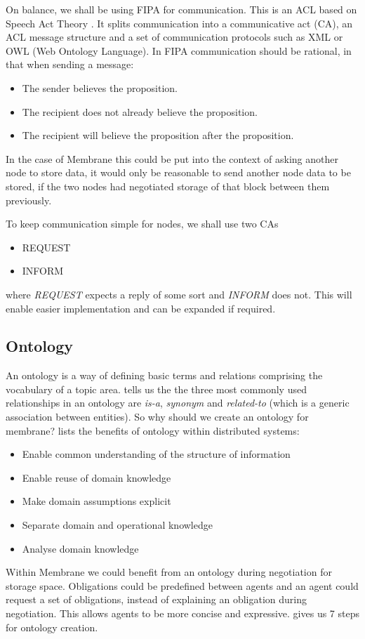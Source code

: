 \documentclass[11pt, a4paper, twocolumn, twoside]{report}
\begin{document}
On balance, we shall be using FIPA for communication. This is an ACL based on Speech Act Theory \citep{labrou1999agent}. It splits communication into a communicative act (CA), an ACL message structure and a set of communication protocols such as XML or OWL (Web Ontology Language). In FIPA communication should be rational, in that when sending a message:
\begin{itemize}
  \item The sender believes the proposition.
  \item The recipient does not already believe the proposition.
  \item The recipient will believe the proposition after the proposition.
\end{itemize}
In the case of Membrane this could be put into the context of asking another node to store data, it would only be reasonable to send another node data to be stored, if the two nodes had negotiated storage of that block between them previously.

To keep communication simple for nodes, we shall use two CAs
\begin{itemize}
  \item REQUEST
  \item INFORM
\end{itemize}
where \emph{REQUEST} expects a reply of some sort and \emph{INFORM} does not. This will enable easier implementation and can be expanded if required.

\subsection{Ontology}

An ontology is a way of defining basic terms and relations comprising the vocabulary of a topic area. \cite{sugumaran2002ontologies} tells us the the three most commonly used relationships in an ontology are \emph{is-a}, \emph{synonym} and \emph{related-to} (which is a generic association between entities). So why should we create an ontology for membrane? \cite{noy2001ontology} lists the benefits of ontology within distributed systems:
\begin{itemize}
 \item Enable common understanding of the structure of information
 \item Enable reuse of domain knowledge
 \item Make domain assumptions explicit
 \item Separate domain and operational knowledge
 \item Analyse domain knowledge
\end{itemize}
Within Membrane we could benefit from an ontology during negotiation for storage space. Obligations could be predefined between agents and an agent could request a set of obligations, instead of explaining an obligation during negotiation. This allows agents to be more concise and expressive. \cite{noy2001ontology} gives us 7 steps for ontology creation.
\end{document}
